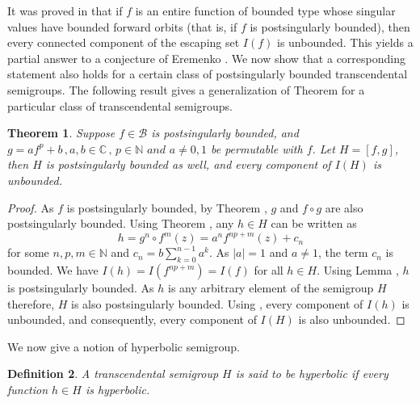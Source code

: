 \documentclass[a4paper,12pt]{amsart}
\numberwithin{equation}{section}
\newtheorem{theorem}{Theorem}[section]
\newtheorem{definition}[theorem]{Definition}
\begin{document}
It was proved in \cite{rempequestion} that if $f$ is an entire function of bounded type whose singular values have bounded forward orbits (that is, if $f$ is postsingularly bounded), then every connected component of the escaping set $I(f)$ is unbounded. This yields a partial answer to a conjecture of Eremenko \cite{eremenko1989iteration}. We now show that a corresponding statement also holds for a certain class of postsingularly bounded transcendental semigroups. The following result gives a generalization of Theorem  for a particular class of transcendental semigroups.
\begin{theorem}
		Suppose $f \in \mathcal{B}$ is postsingularly bounded, and $g = af^p + b \,,a,b\in \mathbb{C}\,, \, p \in \mathbb{N} \, \, and \, \, a \neq 0,1$ be permutable with $f$. Let $H = [f,g]$, then $H$ is postsingularly bounded as well, and every component of $I(H)$ is unbounded.
	\end{theorem}
	\begin{proof}
		As $f$ is postsingularly bounded, by Theorem , $g$ and $f\circ g$ are also postsingularly bounded. Using Theorem , any $h\in H$ can be written as
		\[
		h = g^n \circ f^m(z) = a^n f^{np+m}(z) + c_n
		\]
		for some $n, p, m \in \mathbb{N}$ and $c_n= b \sum_{k=0}^{n-1} a^k$. As $|a|=1$ and $a\neq 1$, the term $c_n$ is bounded. We have $I(h) = I(f^{np+m}) = I(f)$ for all $h\in H$. Using Lemma , $h$ is postsingularly bounded. As $h$ is any arbitrary element of the semigroup $H$ therefore, $H$ is also postsingularly bounded. Using \cite[Theorem 1.1]{rempequestion}, every component of $I(h)$ is unbounded, and consequently, every component of $I(H)$ is also unbounded.
	\end{proof}

		We now give a notion of hyperbolic semigroup.
	
	\begin{definition}
		A transcendental semigroup $H$ is said to be \emph{hyperbolic} if every function $h \in H$ is hyperbolic.
	\end{definition}
	
\end{document}
